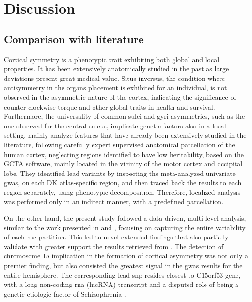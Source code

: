 \chapter{Discussion}\label{chap:discussion}

\section{Comparison with literature}
Cortical symmetry is a phenotypic trait exhibiting both global and local properties. It has been extensively anatomically studied in the past as large deviations present great medical value. Situs inversus, the condition where antisymmetry in the organs placement is exhibited for an individual, is not observed in the asymmetric nature of the cortex, indicating the significance of counter-clockwise torque and other global traits in health and survival. Furthermore, the universality of common sulci and gyri asymmetries, such as the one observed for the central sulcus, implicate genetic factors also in a local setting.  \citet{Sha2021} mainly analyze features that have already been extensively studied in the literature, following carefully expert supervised anatomical parcellation of the human cortex, neglecting regions identified to have low heritability, based on the GCTA software, mainly located in the vicinity of the motor cortex and occipital lobe. They identified lead variants by inspecting the meta-analyzed univariate \ac{gwas}, on each DK atlas-specific region, and then traced back the results to each region separately, using phenotypic decomposition\cite{Lin2020}. Therefore, localized analysis was performed only in an indirect manner, with a predefined parcellation. 

On the other hand, the present study followed a data-driven, multi-level analysis, similar to the work presented in \cite{Naqvi2021} and \cite{Claes2018}, focusing on capturing the entire variability of each  \ac{hsc} partition. This led to novel extended findings that also partially validate with greater support the results retrieved from \citet{Sha2021}. The detection of chromosome 15 implication in the formation of cortical asymmetry was not only a premier finding, but also consisted the greatest signal in the \ac{gwas} results for the entire hemisphere. The corresponding lead \ac{snp} resides closest to C15orf53 gene, with a long non-coding \ac{rna} (lncRNA) transcript and a disputed role of being a genetic etiologic factor of Schizophrenia \cite{Kranz2012}. 

